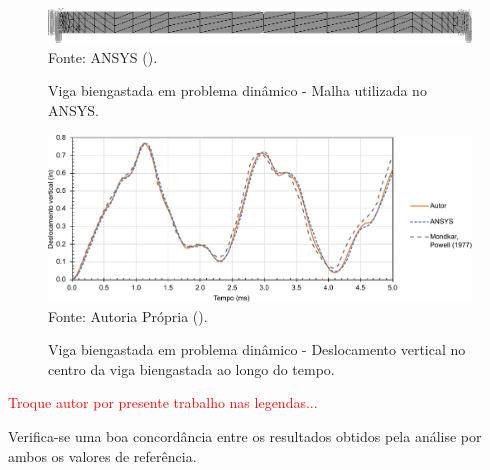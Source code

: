 \begin{figure}[h!]
    \centering
    \caption{Viga biengastada em problema dinâmico - Malha utilizada no ANSYS.}
    \includegraphics[width=\linewidth]{Figuras/vigas/ANSYSmesh2.png}
    \\Fonte: ANSYS (\the\year).
    \label{fig:beamANSYS2}
\end{figure}

\begin{figure}[h!]
    \centering
    \caption{Viga biengastada em problema dinâmico - Deslocamento vertical no centro da viga biengastada ao longo do tempo.}
    \includegraphics[width=\linewidth]{Figuras/vigas/res2.pdf}
    \\Fonte: Autoria Própria (\the\year).
    \label{fig:res-viga2}
\end{figure}

\textcolor{red}{Troque autor por presente trabalho nas legendas...}

Verifica-se uma boa concordância entre os resultados obtidos pela análise por ambos os valores de referência.
